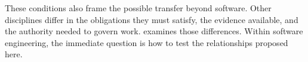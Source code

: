 
These conditions also frame the possible transfer beyond software. Other disciplines differ in the obligations they must satisfy, the evidence available, and the authority needed to govern work.  examines those differences. Within software engineering, the immediate question is how to test the relationships proposed here.
